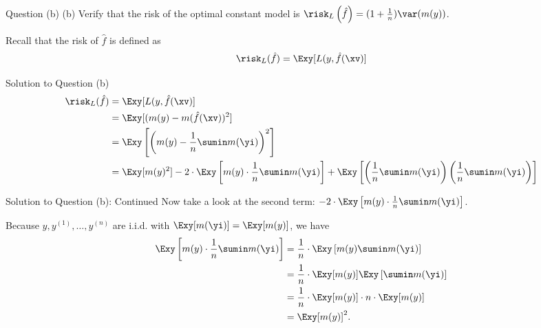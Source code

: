 \documentclass[aspectratio=169]{beamer}
\begin{document}
\begin{frame}{Question (b)}
	(b) Verify that the risk of the optimal constant model is $\risk_L\left(\hat{f} \right) = (1 + \frac{1}{n}) \var(m(y))$.
	
	\vspace{10pt}
	Recall that the risk of $\hat{f}$ is defined as 
	$$\risk_L(\hat{f}) = \Exy[L(y, \hat{f}(\xv)]$$
\end{frame}

\begin{frame}{Solution to Question (b)}
	\small
	\begin{align*}
		\risk_L(\hat{f}) &= \Exy[L(y, \hat{f}(\xv)]\\
		&= \Exy[(m(y) - m(\hat{f}(\xv))^2] \\
		&= \Exy\left[\left(m(y) - \frac{1}{n} \sumin m(\yi) \right)^2 \right] \\
		&= \Exy[m(y)^2] -2 \cdot\Exy \left[m(y) \cdot \frac{1}{n} \sumin m(\yi) \right] + \Exy \left[\left(\frac{1}{n}\sumin m(\yi) \right) \left( \frac{1}{n}\sumin m(\yi) \right) \right]
	\end{align*}
\end{frame}

\begin{frame}{Solution to Question (b): Continued}
	\small
	Now take a look at the second term: $-2 \cdot\Exy \left[m(y) \cdot \frac{1}{n} \sumin m(\yi) \right]$.
	\vspace{10pt}
	
	Because $y, y^{(1)}, \ldots, y^{(n)}$ are i.i.d. with $\Exy[m(\yi)] = \Exy[m(y)]$, we have 
	\begin{align*}
		\Exy \left[m(y) \cdot \frac{1}{n} \sumin m(\yi) \right] &= \frac{1}{n} \cdot \Exy \left[m(y) \sumin m(\yi) \right] \\
		&= \frac{1}{n} \cdot \Exy[m(y)] \Exy \left[\sumin m(\yi) \right] \\
		&= \frac{1}{n} \cdot \Exy[m(y)] \cdot n \cdot \Exy[m(y)] \\
		&= \Exy[m(y)]^2.
	\end{align*}
	
\end{frame}
\end{document}
